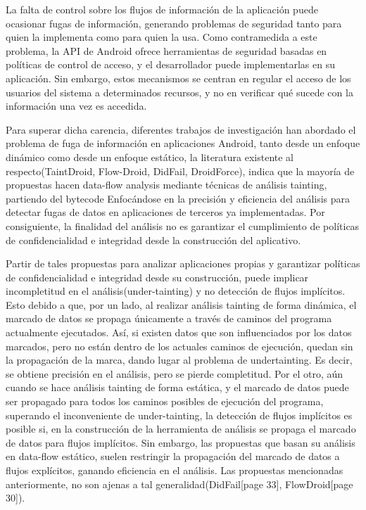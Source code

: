 La falta de control sobre los flujos de información de la aplicación puede
ocasionar fugas de información, generando problemas de seguridad tanto para
quien la implementa como para quien la usa.\newline
Como contramedida a este problema, la API de Android ofrece herramientas de
seguridad basadas en políticas de control de acceso, y el desarrollador puede
implementarlas en su aplicación. Sin embargo, estos mecanismos se centran en
regular el acceso de los usuarios del sistema a determinados recursos, y no en
verificar qué sucede con la información una vez es accedida. 

Para superar dicha carencia, diferentes trabajos de investigación han abordado
el problema de fuga de información en aplicaciones Android, tanto desde un enfoque
dinámico como desde un enfoque estático, la literatura existente al
respecto(TaintDroid\cite{TaintDroid}, Flow-Droid\cite{FlowDroid-Thesis},
DidFail\cite{DidFail}, DroidForce\cite{DroidForce}), indica que la mayoría de
propuestas hacen data-flow analysis mediante técnicas de análisis 
tainting, partiendo del bytecode
Enfocándose en la precisión y eficiencia del análisis para detectar fugas de
datos en aplicaciones de terceros ya implementadas. Por consiguiente,
la finalidad del análisis no es garantizar el cumplimiento de políticas de
confidencialidad e integridad desde la construcción del aplicativo.

Partir de tales propuestas para analizar aplicaciones propias y garantizar
políticas de confidencialidad e integridad desde su construcción, puede implicar
incompletitud en el análisis(under-tainting) y no detección de flujos
implícitos. Esto debido a que,
por un lado, al realizar análisis tainting de forma dinámica, el marcado de
datos se propaga únicamente a través de caminos del programa actualmente
ejecutados. Así, si existen datos que son influenciados por los datos marcados,
pero no están dentro de los actuales caminos de ejecución, quedan sin la
propagación de la marca, dando lugar al problema de
undertainting\cite{dynamic-tainting}\cite{Bit-Level-Taint-Analysis}. Es
decir, se obtiene precisión en el análisis, pero se pierde completitud.\newline
Por el otro, aún cuando se hace análisis tainting de forma estática, y el
marcado de datos puede ser propagado para todos los caminos posibles de
ejecución  del programa, superando el inconveniente de under-tainting, la
detección de flujos implícitos es posible si, en la construcción de la
herramienta de análisis se propaga el marcado de datos para flujos
implícitos\cite{taint-analysis}. 
Sin embargo, las propuestas que basan su análisis en data-flow estático,
suelen restringir la propagación del marcado de datos a flujos explícitos,
ganando eficiencia en el análisis. Las propuestas mencionadas anteriormente, no
son ajenas a tal generalidad(DidFail\cite{DidFail}[page 33],
FlowDroid\cite{FlowDroid-Thesis}[page 30]).

